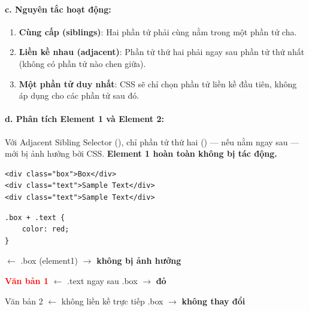 \paragraph{c. Nguyên tắc hoạt động:}

\begin{noteBox}
\begin{enumerate}[leftmargin=1.5em, itemsep=3pt, parsep=0pt]
    \item \textbf{Cùng cấp (siblings)}: Hai phần tử phải cùng nằm trong một phần tử cha.
    \item \textbf{Liền kề nhau (adjacent)}: Phần tử thứ hai phải ngay sau phần tử thứ nhất (không có phần tử nào chen giữa).
    \item \textbf{Một phần tử duy nhất}: CSS sẽ chỉ chọn phần tử liền kề đầu tiên, không áp dụng cho các phần tử sau đó.
\end{enumerate}
\end{noteBox}

\paragraph{d. Phân tích Element 1 và Element 2:}
Với Adjacent Sibling Selector (\codeinline{+}), chỉ phần tử thứ hai () --- nếu nằm ngay sau  --- mới bị ảnh hưởng bởi CSS. \textbf{Element 1 hoàn toàn không bị tác động.}

\begin{codeWindow}
\begin{lstlisting}[language=HTML5]
<div class="box">Box</div>
<div class="text">Sample Text</div>
<div class="text">Sample Text</div>
\end{lstlisting}

\begin{lstlisting}[language=CSS3]
.box + .text {
    color: red;
}
\end{lstlisting}
\end{codeWindow}

\begin{browserWindow}
\sffamily\small
{} {\small\textcolor{gray!60}{$\leftarrow$ .box (element1) $\rightarrow$ \textbf{không bị ảnh hưởng}}} \par\vspace{4pt}
\textcolor{red}{\textbf{Văn bản 1}} {\small\textcolor{gray!60}{$\leftarrow$ .text ngay sau .box $\rightarrow$ \textbf{đỏ}}} \par\vspace{2pt}
\textcolor{darkText}{Văn bản 2} {\small\textcolor{gray!60}{$\leftarrow$ không liền kề trực tiếp .box $\rightarrow$ \textbf{không thay đổi}}} \par\vspace{4pt}
\end{browserWindow}

